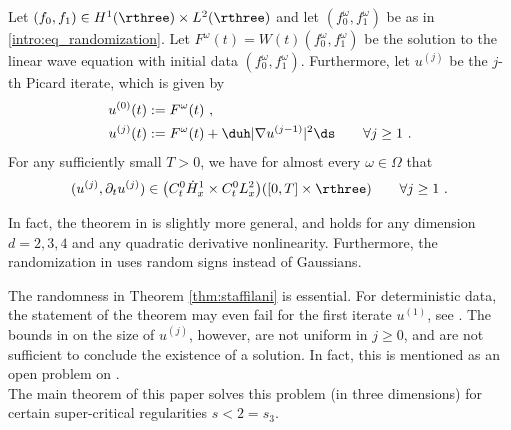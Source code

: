 \documentclass[11pt]{article}
\begin{document}
\begin{thm}\label{thm:staffilani}
Let \( (f_0 , f_1) \in H^1(\rthree)\times L^2(\rthree) \) and let \( (f_0^\omega,f_1^\omega) \) be as in \eqref{intro:eq_randomization}. Let \( F^\omega(t) = W(t)(f_0^\omega,f_1^\omega) \) be the solution to the linear wave equation with initial data \( (f_0^\omega,f_1^\omega) \). Furthermore, let \( u^{(j)} \) be the \( j\)-th Picard iterate, which is given by
\begin{align*}
u^{(0)}(t) &:= F^\omega(t)~, \\
u^{(j)} (t) &:= F^\omega(t) + \duh |\nabla u^{(j-1)}|^2\ds \qquad \forall j\geq 1~. 
\end{align*}
For any sufficiently small \( T>0 \), we have for almost every \( \omega \in \Omega \) that
\begin{equation*}
(u^{(j)}, \partial_t u^{(j)} ) \in \big( C_t^0 \dot{H}^1_x \times C_t^0 L^2_x\big)([0,T]\times \rthree) \qquad \forall j\geq 1~. 
\end{equation*}
\end{thm}
\begin{rem}
In fact, the theorem in \cite{CCMNS18} is slightly more general, and holds for any dimension \( d=2,3,4 \) and any quadratic derivative nonlinearity. Furthermore, the randomization in \cite{CCMNS18} uses random signs instead of Gaussians.
\end{rem}
The randomness in Theorem \ref{thm:staffilani} is essential. For deterministic data, the statement of the theorem may even fail for the first iterate \( u^{(1)} \), see \cite{FK00,Zhou97}. The bounds in \cite{CCMNS18} on the size of \( u^{(j)} \), however,  are not uniform in \( j\geq 0\), and are not sufficient to conclude the existence of a solution.  In fact, this is mentioned as an open problem on \cite[p.3]{CCMNS18}. \\
 The main theorem of this paper solves this problem (in three dimensions) for certain super-critical regularities \( s < 2 = s_3  \).
\end{document}
